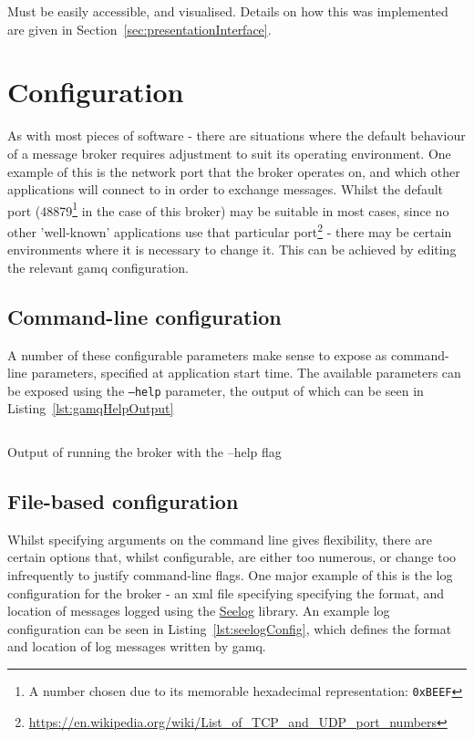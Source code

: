 Must be easily accessible, and visualised. Details on how this was implemented
are given in Section~\ref{sec:presentationInterface}.

\section{Configuration}
\label{sec:Configuration}

As with most pieces of software - there are situations where the default
behaviour of a message broker requires adjustment to suit its operating
environment. One example of this is the network port that the broker operates
on, and which other applications will connect to in order to exchange messages.
Whilst the default port (48879\footnote{A number chosen due to its memorable
hexadecimal representation: \texttt{0xBEEF}} in the case of this broker) may be
suitable in most cases, since no other 'well-known' applications use that
particular
port\footnote{\url{https://en.wikipedia.org/wiki/List_of_TCP_and_UDP_port_numbers}} -
there may be certain environments where it is necessary to change it. This can
be achieved by editing the relevant \gls{gamq} configuration.

\subsection{Command-line configuration}
\label{sub:Command-line configuration}

A number of these configurable parameters make sense to expose as command-line
parameters, specified at application start time. The available parameters can be
exposed using the \texttt{--help} parameter, the output of which can be seen in
Listing~\ref{lst:gamqHelpOutput}

\begin{listing}[ht]
  \centering
  \inputminted{bash}{code/gamqHelpOutput}
  \caption{Output of running the broker with the --help flag}
  \label{lst:gamqHelpOutput}
\end{listing}

\subsection{File-based configuration}
\label{sub:File-based configuration}

Whilst specifying arguments on the command line gives flexibility, there are
certain options that, whilst configurable, are either too numerous, or change
too infrequently to justify command-line flags. One major example of this is the
log configuration for the broker - an \gls{xml} file specifying specifying the
format, and location of messages logged using the
\href{https://github.com/cihub/seelog}{Seelog} library. An example log
configuration can be seen in Listing~\ref{lst:seelogConfig}, which defines the
format and location of log messages written by gamq.

